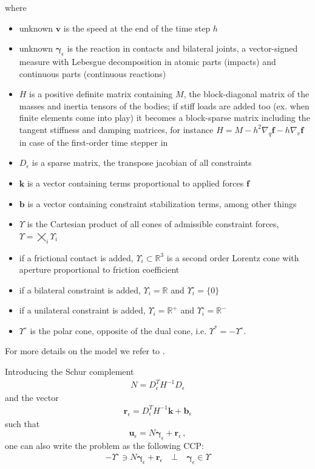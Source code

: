 \documentclass[final,3p]{elsarticle}
\newcommand{\vect}[1]{\bm{#1}}
\begin{document}
where 
\begin{itemize}
		\item unknown $\vect{v}$ is the speed at the end of the time step $h$
		\item unknown $\vect{\gamma}_\epsilon$ is the reaction in contacts and bilateral joints, a vector-signed measure with Lebesgue decomposition in atomic parts (impacts) and continuous parts (continuous reactions)
    \item $H$ is a positive definite matrix containing $M$, the block-diagonal matrix of the masses and inertia tensors of the bodies; if stiff
		loads are added too (ex. when finite elements come into play) it becomes a block-sparse matrix including the tangent stiffness and damping matrices,
		for instance $H=M-{h^2}\nabla_q\vect{f}-{h}\nabla_v\vect{f}$ in case of the first-order time stepper in \cite{TasoraAnitescuCMAME10}
    \item $D_\epsilon$ is a sparse matrix, the transpose jacobian of all constraints
    \item $\vect{k}$ is a vector containing terms proportional to applied forces $\vect{f}$
    \item $\vect{b}$ is a vector containing constraint stabilization terms, among other things
    \item $\Upsilon$ is the Cartesian product of all cones of admissible constraint forces, $\Upsilon = \bigtimes_i \Upsilon_i$
    \item if a frictional contact is added, $\Upsilon_i \subset \mathbb{R}^3$ is a second order Lorentz cone with aperture proportional to friction coefficient
    \item if a bilateral constraint is added, $\Upsilon_i = \mathbb{R}$ and $\Upsilon^\circ_i = \{0\}$
    \item if a unilateral constraint is added, $\Upsilon_i = \mathbb{R}^+$ and $\Upsilon^\circ_i = \mathbb{R}^-$
    \item $\Upsilon^{\circ}$ is the polar cone, opposite of the dual cone, i.e. $\Upsilon^{*} = -\Upsilon^\circ$.
\end{itemize}

For more details on the model we refer to 
\cite{negrutSerbanTasoraJCND2017}. %

Introducing the Schur complement 
\begin{align}
N=D_{\epsilon}^T H^{-1} D_{\epsilon}
\label{eq:schur_n}
\end{align}
and the vector
\begin{align}
\vect{r}_\epsilon = D_{\epsilon}^T H^{-1} \vect{k} + \vect{b}_\epsilon
\label{eq:schur_r}
\end{align}
such that
\[
\vect{u}_\epsilon = N \vect{\gamma}_\epsilon + \vect{r}_\epsilon \, , 
\]
one can also write the problem as the following CCP:
\begin{align}
    -\Upsilon^{\circ} \ni  N \vect{\gamma}_\epsilon + \vect{r}_\epsilon 
    \quad \bot \quad  
    \vect{\gamma}_\epsilon \in \Upsilon
	\label{eq:ChronoCCP}
\end{align}
\end{document}
